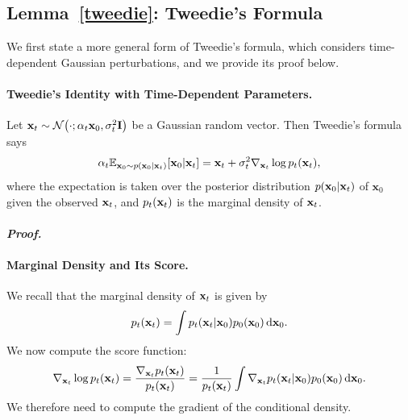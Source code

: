 \subsection{Lemma~\ref{tweedie}: Tweedie's Formula}\label{app-sec:tweedie}
We first state a more general form of Tweedie’s formula, which considers time-dependent Gaussian perturbations, and we provide its proof below.


\paragraph{Tweedie’s Identity with Time-Dependent Parameters.}
Let ${\mathbf{x}}_t \sim \mathcal{N}\big(\cdot; \alpha_t{\mathbf{x}}_0, \sigma_t^2{\mathbf{I}}\big)$ be a Gaussian random vector. Then Tweedie's formula says
\begin{align*}
\alpha_t \mathbb{E}_{\mathbf{x}_0 \sim p(\mathbf{x}_0|{\mathbf{x}}_t)}[\mathbf{x}_0|{\mathbf{x}}_t] = {\mathbf{x}}_t + \sigma_t^2 \nabla_{{\mathbf{x}}_t} \log p_t({\mathbf{x}}_t),
\end{align*}
where the expectation is taken over the posterior distribution $p(\mathbf{x}_0|{\mathbf{x}}_t)$ of $\mathbf{x}_0$ given the observed ${\mathbf{x}}_t$, and $p_t({\mathbf{x}}_t)$ is the marginal density of ${\mathbf{x}}_t$.


\paragraph{\textit{Proof.}}


\paragraph{Marginal Density and Its Score.}
We recall that the marginal density of ${\mathbf{x}}_t$ is given by
\begin{align*}
p_t({\mathbf{x}}_t) = \int p_t({\mathbf{x}}_t|{\mathbf{x}}_0)  p_0({\mathbf{x}}_0)  \mathop{}\!\mathrm{d}{\mathbf{x}}_0.
\end{align*}
We now compute the score function:
\begin{align*}
\nabla_{{\mathbf{x}}_t} \log p_t({\mathbf{x}}_t) 
= \frac{\nabla_{{\mathbf{x}}_t} p_t({\mathbf{x}}_t)}{p_t({\mathbf{x}}_t)} = \frac{1}{p_t({\mathbf{x}}_t)} \int \nabla_{{\mathbf{x}}_t} p_t({\mathbf{x}}_t|{\mathbf{x}}_0)  p_0({\mathbf{x}}_0)  \mathop{}\!\mathrm{d}{\mathbf{x}}_0.
\end{align*}
We therefore need to compute the gradient of the conditional density.

